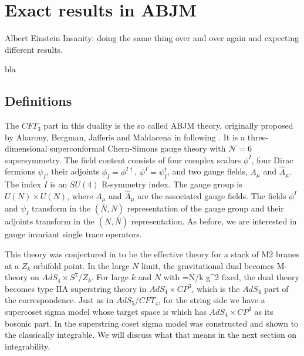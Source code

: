 
\section{Exact results in ABJM}

\begin{chapquote}{Albert Einstein}
Insanity: doing the same thing over and over again and expecting different results.
\end{chapquote}

\noindent bla


\subsection{Definitions}

The $CFT_3$ part in this duality is the so called ABJM theory, originally proposed by Aharony, Bergman, Jafferis and Maldacena in \cite{Aharony:2008ug} following \cite{Schwarz:2004yj} \cite{Schwarz:2004yj1} \cite{Schwarz:2004yj2}. It is a three-dimensional superconformal Chern-Simons gauge theory with $\mathcal{N}=6$ supersymmetry. The field content consists of four complex scalars $\phi^I$, four Dirac fermions $\psi_I$, their adjoints $\phi_I=\phi^{I\dagger}$, $\psi^I=\psi_I^\dagger$, and two gauge fields, $A_\mu$ and $\hat{A}_\mu$. The index $I$ is an $SU(4)$ R-symmetry index. The gauge group is $U(N) \times U(N)$, where $A_{\mu}$ and $\hat{A}_{\mu}$ are the associated gauge fields. The fields $\phi^I$ and $\psi_I$ transform in the $(\bar{N},N)$ representation of the gauge group and their adjoints transform in the $(N,\bar{N})$ representation. As before, we are interested in gauge invariant single trace operators.

This theory was conjectured in  \cite{Aharony:2008ug} to be the effective theory for a stack of M2 branes at a $Z_k$ orbifold point. In the large $N$ limit, the gravitational dual becomes M-theory on  $AdS_4\times S^7/Z_k$. For large $k$ and $N$ with
\beq
\lambda=N/k  g^2
\eeq
fixed, the dual theory becomes type IIA superstring theory in $AdS_4\times CP^3$, which is the $AdS_4$ part of the correspondence. Just as in $AdS_5/CFT_4$, for the string side we have a supercoset sigma model whose target space is
\beq
{}
\eeq
which has $AdS_4\times CP^3$ as its bosonic part. In \cite{Stefanski:2008ik,Arutyunov:2008if} the superstring coset sigma model was constructed and shown to the classically integrable. We will discuss what that means in the next section on integrability.

